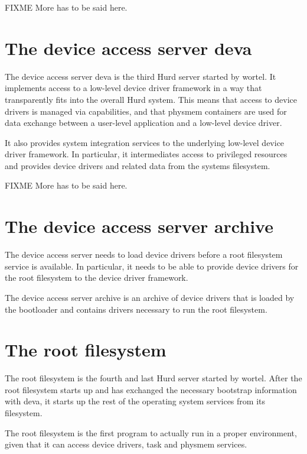 FIXME More has to be said here.


\section{The device access server deva}

The device access server deva is the third Hurd server started by
wortel.  It implements access to a low-level device driver framework
in a way that transparently fits into the overall Hurd system.  This
means that access to device drivers is managed via capabilities, and
that physmem containers are used for data exchange between a
user-level application and a low-level device driver.

It also provides system integration services to the underlying
low-level device driver framework.  In particular, it intermediates
access to privileged resources and provides device drivers and related
data from the systems filesystem.

FIXME More has to be said here.


\section{The device access server archive}

The device access server needs to load device drivers before a root
filesystem service is available.  In particular, it needs to be able
to provide device drivers for the root filesystem to the device driver
framework.

The device access server archive is an archive of device drivers that
is loaded by the bootloader and contains drivers necessary to run the
root filesystem.


\section{The root filesystem}

The root filesystem is the fourth and last Hurd server started by
wortel.  After the root filesystem starts up and has exchanged the
necessary bootstrap information with deva, it starts up the rest of
the operating system services from its filesystem.

The root filesystem is the first program to actually run in a proper
environment, given that it can access device drivers, task and physmem
services.

\begin{comment}
  From the time the root filesystem starts up, the bootstrap continues
  roughly as it is implemented in the Hurd running on GNU Mach.
\end{comment}
